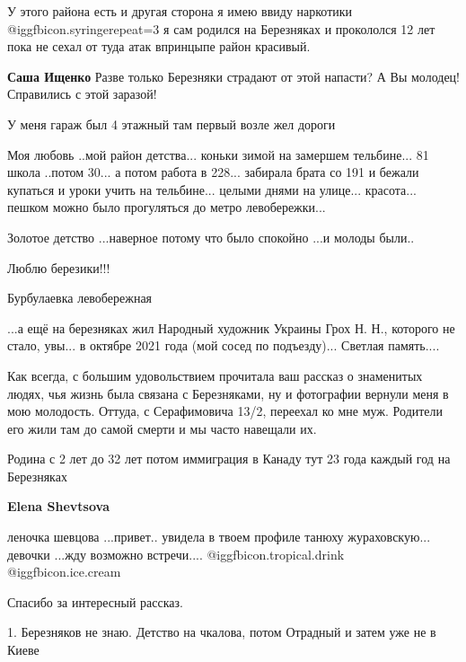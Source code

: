 \begin{itemize}
У этого района есть и другая сторона я имею ввиду наркотики
@igg{fbicon.syringe}{repeat=3} я сам родился на Березняках и прокололся 12 лет
пока не сехал от туда атак впринцыпе район красивый.

\begin{itemize} %
\textbf{Саша Ищенко}
Разве только Березняки страдают от этой напасти?
А Вы молодец! Справились с этой заразой!
\end{itemize} %

У меня гараж был 4 этажный там первый возле жел дороги


Моя любовь ..мой район детства... коньки зимой на замершем тельбине... 81 школа
..потом 30... а потом работа в 228... забирала брата со 191 и бежали купаться и
уроки учить на тельбине... целыми днями на улице... красота... пешком можно было
прогуляться до метро левобережки...

Золотое детство ...наверное потому что было спокойно ...и молоды были..

Люблю березики!!!

Бурбулаевка левобережная


...а ещё на березняках жил Народный художник Украины Грох Н. Н., которого не
стало, увы... в октябре 2021 года (мой сосед по подъезду)... Светлая память....


Как всегда, с большим удовольствием прочитала ваш рассказ о знаменитых людях,
чья жизнь была связана с Березняками, ну и фотографии вернули меня в мою
молодость. Оттуда, с Серафимовича 13/2, переехал ко мне муж. Родители его жили
там до самой смерти и мы часто навещали их.


Родина с 2 лет до 32 лет потом иммиграция в Канаду тут 23 года каждый год на
Березняках

\textbf{Elena Shevtsova} 

леночка шевцова ...привет.. увидела в твоем профиле танюху жураховскую... девочки
...жду возможно встречи.... @igg{fbicon.tropical.drink}  @igg{fbicon.ice.cream} 

Спасибо за интересный рассказ.


1. Березняков не знаю. Детство на чкалова, потом Отрадный и затем уже не в
Киеве


\end{itemize}
